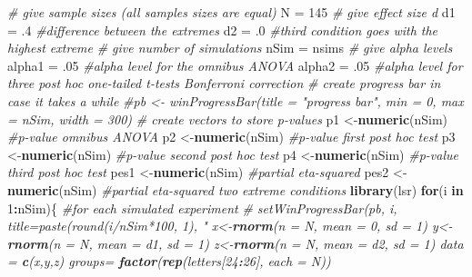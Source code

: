 \documentclass[]{book}
\newenvironment{Shaded}{\begin{snugshade}}{\end{snugshade}}
\newcommand{\CommentTok}[1]{\textcolor[rgb]{0.56,0.35,0.01}{\textit{#1}}}
\newcommand{\ControlFlowTok}[1]{\textcolor[rgb]{0.13,0.29,0.53}{\textbf{#1}}}
\newcommand{\DataTypeTok}[1]{\textcolor[rgb]{0.13,0.29,0.53}{#1}}
\newcommand{\DecValTok}[1]{\textcolor[rgb]{0.00,0.00,0.81}{#1}}
\newcommand{\FloatTok}[1]{\textcolor[rgb]{0.00,0.00,0.81}{#1}}
\newcommand{\KeywordTok}[1]{\textcolor[rgb]{0.13,0.29,0.53}{\textbf{#1}}}
\newcommand{\NormalTok}[1]{#1}
\newcommand{\OperatorTok}[1]{\textcolor[rgb]{0.81,0.36,0.00}{\textbf{#1}}}
\newcommand{\StringTok}[1]{\textcolor[rgb]{0.31,0.60,0.02}{#1}}
\begin{document}
\begin{Shaded}
\begin{Highlighting}[]
\CommentTok{# give sample sizes (all samples sizes are equal)}
\NormalTok{N =}\StringTok{ }\DecValTok{145}
\CommentTok{# give effect size d}
\NormalTok{d1 =}\StringTok{ }\FloatTok{.4} \CommentTok{#difference between the extremes}
\NormalTok{d2 =}\StringTok{ }\FloatTok{.0} \CommentTok{#third condition goes with the highest extreme}
\CommentTok{# give number of simulations}
\NormalTok{nSim =}\StringTok{ }\NormalTok{nsims}
\CommentTok{# give alpha levels}
\NormalTok{alpha1 =}\StringTok{ }\FloatTok{.05} \CommentTok{#alpha level for the omnibus ANOVA}
\NormalTok{alpha2 =}\StringTok{ }\FloatTok{.05} \CommentTok{#alpha level for three post hoc one-tailed t-tests Bonferroni correction}
\CommentTok{# create progress bar in case it takes a while}
\CommentTok{#pb <- winProgressBar(title = "progress bar", min = 0, max = nSim, width = 300)}
\CommentTok{# create vectors to store p-values}
\NormalTok{p1 <-}\KeywordTok{numeric}\NormalTok{(nSim) }\CommentTok{#p-value omnibus ANOVA}
\NormalTok{p2 <-}\KeywordTok{numeric}\NormalTok{(nSim) }\CommentTok{#p-value first post hoc test}
\NormalTok{p3 <-}\KeywordTok{numeric}\NormalTok{(nSim) }\CommentTok{#p-value second post hoc test}
\NormalTok{p4 <-}\KeywordTok{numeric}\NormalTok{(nSim) }\CommentTok{#p-value third post hoc test}
\NormalTok{pes1 <-}\KeywordTok{numeric}\NormalTok{(nSim) }\CommentTok{#partial eta-squared}
\NormalTok{pes2 <-}\KeywordTok{numeric}\NormalTok{(nSim) }\CommentTok{#partial eta-squared two extreme conditions}
\KeywordTok{library}\NormalTok{(lsr)}
\ControlFlowTok{for}\NormalTok{(i }\ControlFlowTok{in} \DecValTok{1}\OperatorTok{:}\NormalTok{nSim)\{ }\CommentTok{#for each simulated experiment}
 \CommentTok{# setWinProgressBar(pb, i, title=paste(round(i/nSim*100, 1), "%
\NormalTok{  x<-}\KeywordTok{rnorm}\NormalTok{(}\DataTypeTok{n =}\NormalTok{ N, }\DataTypeTok{mean =} \DecValTok{0}\NormalTok{, }\DataTypeTok{sd =} \DecValTok{1}\NormalTok{)}
\NormalTok{  y<-}\KeywordTok{rnorm}\NormalTok{(}\DataTypeTok{n =}\NormalTok{ N, }\DataTypeTok{mean =}\NormalTok{ d1, }\DataTypeTok{sd =} \DecValTok{1}\NormalTok{) }
\NormalTok{  z<-}\KeywordTok{rnorm}\NormalTok{(}\DataTypeTok{n =}\NormalTok{ N, }\DataTypeTok{mean =}\NormalTok{ d2, }\DataTypeTok{sd =} \DecValTok{1}\NormalTok{) }
\NormalTok{  data =}\StringTok{ }\KeywordTok{c}\NormalTok{(x,y,z)}
\NormalTok{  groups=}\StringTok{ }\KeywordTok{factor}\NormalTok{(}\KeywordTok{rep}\NormalTok{(letters[}\DecValTok{24}\OperatorTok{:}\DecValTok{26}\NormalTok{], }\DataTypeTok{each =}\NormalTok{ N))}
}
\end{Highlighting}
\end{Shaded}
\end{document}
